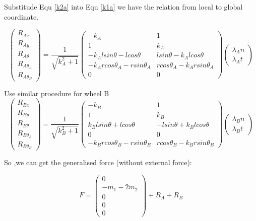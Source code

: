 \documentclass[12 pt]{article}
\begin{document}
Substitude Equ \ref{k2a} into Equ \ref{k1a}
we have the relation from local to global coordinate.

\begin{equation}
\begin{pmatrix}
R_{Ax}\\ R_{Ay}\\ R_{A\theta} \\R_{A\theta_A}\\ R_{A\theta_B}
\end{pmatrix}=\frac{1}{\sqrt{k_A^2+1}}
\begin{pmatrix}
-k_A & 1 \\
1 & k_A \\
 -k_Alsin\theta-lcos\theta & lsin\theta-k_Alcos\theta \\
 -k_Arcos\theta_A-rsin\theta_A & rcos\theta_A-k_Arsin\theta_A\\
0& 0 \end{pmatrix}
\begin{pmatrix}
\lambda_An \\ \lambda_At
\end{pmatrix}
\end{equation}

Use similar procedure for wheel B
\begin{equation}
\begin{pmatrix}
R_{Bx}\\ R_{By}\\ R_{B\theta} \\R_{B\theta_A}\\ R_{B\theta_B}
\end{pmatrix}=\frac{1}{\sqrt{k_B^2+1}}
\begin{pmatrix}
 -k_B & 1\\
1 & k_B  \\
k_Blsin\theta+lcos\theta & -lsin\theta+k_Blcos\theta\\
0& 0 \\
-k_Brcos\theta_B-rsin\theta_B & rcos\theta_B-k_Brsin\theta_B
 \end{pmatrix}
\begin{pmatrix}
\lambda_Bn \\ \lambda_Bt
\end{pmatrix}
\end{equation}

So ,we can get the generalised force (without external force):

\begin{equation}
F=\begin{pmatrix}
0 \\ -m_1-2m_2 \\ 0 \\0 \\ 0 \end{pmatrix} +R_A+R_B
\end{equation}
\end{document}
